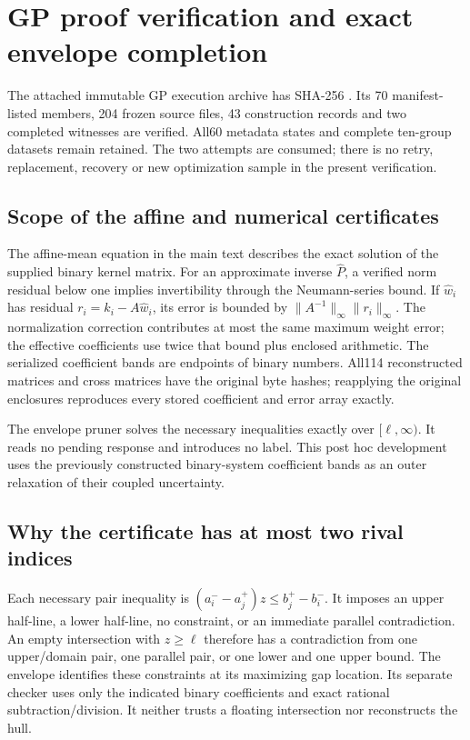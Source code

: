 \section{GP proof verification and exact envelope completion}\label{supp:gp_completion}

The attached immutable GP execution archive has SHA-256 . Its 70 manifest-listed members, 204 frozen source files, 43 construction records and two completed witnesses are verified. All60 metadata states and complete ten-group datasets remain retained. The two attempts are consumed; there is no retry, replacement, recovery or new optimization sample in the present verification.

\subsection{Scope of the affine and numerical certificates}
The affine-mean equation in the main text describes the exact solution of the supplied binary kernel matrix. For an approximate inverse $\widehat P$, a verified norm residual below one implies invertibility through the Neumann-series bound. If $\widehat w_i$ has residual $r_i=k_i-A\widehat w_i$, its error is bounded by $\|A^{-1}\|_\infty\|r_i\|_\infty$. The normalization correction contributes at most the same maximum weight error; the effective coefficients use twice that bound plus enclosed arithmetic. The serialized coefficient bands are endpoints of binary numbers. All114 reconstructed matrices and cross matrices have the original byte hashes; reapplying the original enclosures reproduces every stored coefficient and error array exactly.

The envelope pruner solves the necessary inequalities exactly over $[\ell,\infty)$. It reads no pending response and introduces no label. This post hoc development uses the previously constructed binary-system coefficient bands as an outer relaxation of their coupled uncertainty.

\subsection{Why the certificate has at most two rival indices}
Each necessary pair inequality is $(a_i^--a_j^+)z\leq b_j^+-b_i^-$. It imposes an upper half-line, a lower half-line, no constraint, or an immediate parallel contradiction. An empty intersection with $z\geq\ell$ therefore has a contradiction from one upper/domain pair, one parallel pair, or one lower and one upper bound. The envelope identifies these constraints at its maximizing gap location. Its separate checker uses only the indicated binary coefficients and exact rational subtraction/division. It neither trusts a floating intersection nor reconstructs the hull.

